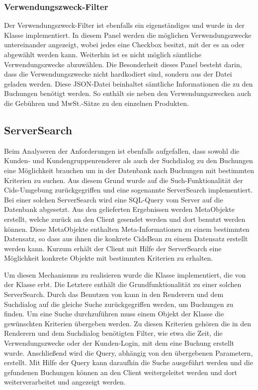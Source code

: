 \subsubsection{Verwendungszweck-Filter}
Der Verwendungszweck-Filter ist ebenfalls ein eigenständiges  und wurde in der Klasse  implementiert.
In diesem Panel werden die möglichen Verwendungszwecke untereinander angezeigt, wobei jedes eine Checkbox besitzt, mit der es an oder abgewählt werden kann. Weiterhin ist es nicht möglich sämtliche Verwendungszwecke abzuwählen.
Die Besonderheit dieses Panel besteht darin, dass die Verwendungszwecke nicht hardkodiert sind, sondern aus der  Datei geladen werden.
Diese JSON-Datei beinhaltet sämtliche Informationen die zu den Buchungen benötigt werden. So enthält sie neben den Verwendungszwecken auch die Gebühren und MwSt.-Sätze zu den einzelnen Produkten. 

\subsection{ServerSearch}
Beim Analyseren der Anforderungen ist ebenfalls aufgefallen, dass sowohl die Kunden- und Kundengruppenrenderer als auch der Suchdialog zu den Buchungen eine Möglichkeit brauchen um in der Datenbank nach Buchungen mit bestimmten Kriterien zu suchen.
Aus diesem Grund wurde auf die Such-Funktionalität der Cids-Umgebung zurückgegriffen und eine sogenannte ServerSearch implementiert.
Bei einer solchen ServerSearch wird eine SQL-Query vom Server auf die Datenbank abgesetzt. 
Aus den gelieferten Ergebnissen werden MetaObjekte erstellt, welche zurück an den Client gesendet werden und dort benutzt werden können.
Diese MetaObjekte enthalten Meta-Informationen zu einem bestimmten Datensatz, so dass aus ihnen die konkrete CidsBean zu einem Datensatz erstellt werden kann.
Kurzum erhält der Client mit Hilfe der ServerSearch eine Möglichkeit konkrete Objekte mit bestimmten Kriterien zu erhalten.  

Um diesen Mechanismus zu realisieren wurde die Klasse  implementiert, die von der Klasse  erbt.
Die Letztere enthält die Grundfunktionalität zu einer solchen ServerSearch.
Durch das Benutzen von  kann in den Renderern und dem Suchdialog auf die gleiche Suche zurückgegriffen werden, um Buchungen zu finden.
Um eine Suche durchzuführen muss einem Objekt der Klasse  die gewünschten Kriterien übergeben werden. Zu diesen Kriterien gehören die in den Renderern und dem Suchdialog benötigten Filter, wie etwa die Zeit, die Verwendungszwecke oder der Kunden-Login, mit dem eine Buchung erstellt wurde.
Anschließend wird die Query, abhängig von den übergebenen Parametern, erstellt. 
Mit Hilfe der Query kann daraufhin die Suche ausgeführt werden und die gefundenen Buchungen können an den Client weitergeleitet werden und dort weiterverarbeitet und angezeigt werden.



